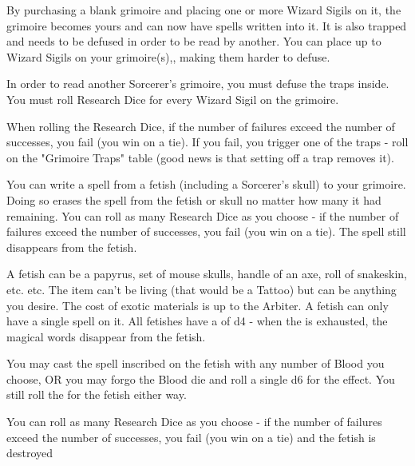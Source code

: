 {

By purchasing a blank grimoire and placing one or more Wizard Sigils on it, the grimoire becomes yours and can now have spells written into it.  It is also trapped and needs to be defused in order to be read by another.   You can place up to \LVL Wizard Sigils on your grimoire(s),, making them harder to defuse.


In order to read another Sorcerer's grimoire, you must defuse the traps inside.  You must roll Research Dice for every Wizard Sigil on the grimoire.  

When rolling the Research Dice, if the number of failures exceed the number of successes, you fail (you win on a tie).  If you fail, you trigger one of the traps - roll on the "Grimoire Traps" table (good news is that setting off a trap removes it).


You can write a spell from a fetish (including a Sorcerer's skull) to your grimoire.  Doing so erases the spell from the fetish or skull no matter how many \UD it had remaining.  You can roll as many Research Dice as you choose - if the number of failures exceed the number of successes, you fail (you win on a tie).  The spell still disappears from the fetish.


A fetish can be a papyrus, set of mouse skulls, handle of an axe, roll of snakeskin, etc. etc.  The item can't be living (that would be a Tattoo) but can be anything you desire.  The cost of exotic materials is up to the Arbiter. A fetish can only have a single spell on it.  All fetishes have a \UD of d4 - when the \UD is exhausted, the magical words disappear from the fetish. 

You may cast the spell inscribed on the fetish with any number of Blood you choose, OR you may forgo the Blood die and roll a single d6 for the effect.  You still roll the \UD for the fetish either way.

You can roll as many Research Dice as you choose - if the number of failures exceed the number of successes, you fail (you win on a tie) and the fetish is destroyed 



}
